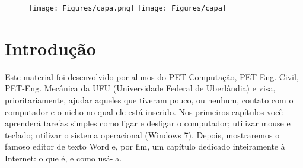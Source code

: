\documentclass[hidelinks,12pt]{article}
\newcommand{\bigicon}[1]{\texttt{[image: \#1]}}
\newcommand{\iconb}[1]{\texttt{[image: \#1]}}
\begin{document}
\pagestyle{fancy}


\lhead{\bigicon{Figures/ufu}}
\rhead{\bigicon{Figures/facom}}
\lfoot{}
\cfoot{}
\rfoot{}
\vspace*{1cm}
\begin{figure}[!h]
	\centering
	\texttt{[image: Figures/capa.png]}
	\texttt{[image: Figures/capa]}

\end{figure}


\newpage
\fancyhead[C]{}
\fancyhead[R]{\iconb{Figures/comppet}}
\fancyhead[L]{\leftmark}
\fancyfoot{}
\fancyfoot[C]{\hspace{3.0cm}\thepage}


\tableofcontents
\listoffigures

{\let\thefootnote\relax{}}

{\let\thefootnote\relax{}}

{\let\thefootnote\relax{}}

\newpage

\section{Introdução}

 Este material foi desenvolvido por alunos do PET-Computação, PET-Eng. Civil, PET-Eng. Mecânica da UFU (Universidade Federal de Uberlândia) e visa, prioritariamente, ajudar aqueles que tiveram pouco, ou nenhum, contato com o computador e o nicho no qual ele está inserido. Nos primeiros capítulos você aprenderá tarefas simples como ligar e desligar o computador; utilizar mouse e teclado; utilizar o sistema operacional (Windows 7). Depois, mostraremos o famoso editor de texto Word e, por fim, um capítulo dedicado inteiramente à Internet: o que é, e como usá-la.
 
\end{document}
